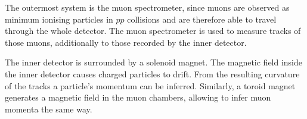 The outermost system is the muon spectrometer, since muons are observed as minimum ionising particles in $pp$ collisions and are therefore able to travel through the whole detector. The muon spectrometer is used to measure tracks of those muons, additionally to those recorded by the inner detector.

The inner detector is surrounded by a solenoid magnet. The magnetic field inside the inner detector causes charged particles to drift. From the resulting curvature of the tracks a particle's momentum can be inferred.
Similarly, a toroid magnet generates a magnetic field in the muon chambers, allowing to infer muon momenta the same way.
